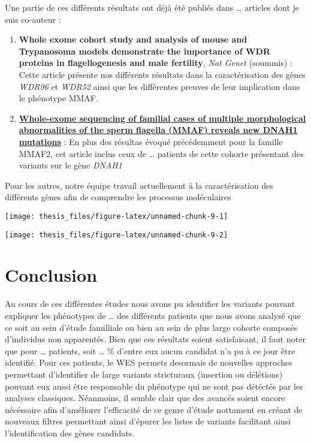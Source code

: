 \documentclass[12pt,twoside]{reedthesis}
\theoremstyle{definition}
\theoremstyle{definition}
\theoremstyle{remark}
\begin{document}
  Une partie de ces différents résultats ont déjà été publiés dans
  \ldots{} articles dont je suis co-auteur :
  
  \begin{enumerate}
  \def\labelenumi{\arabic{enumi}.}
  \item
    \textbf{Whole exome cohort study and analysis of mouse and Trypanosoma
    models demonstrate the importance of WDR proteins in flagellogenesis
    and male fertility}, \emph{Nat Genet} (soummis) : Cette article
    présente nos différents résultats dans la caractérisation des gènes
    \emph{WDR96} et \emph{WDR52} ainsi que les différentes preuves de leur
    implication dans le phénotype MMAF.
  \item
    \protect\hyperlink{famdnah1}{\textbf{Whole-exome sequencing of
    familial cases of multiple morphological abnormalities of the sperm
    flagella (MMAF) reveals new DNAH1 mutations}} : En plus des résultas
    évoqué précédemment pour la famille MMAF2, cet article inclus ceux de
    \ldots{} patients de cette cohorte présentant des variants sur le gène
    \emph{DNAH1}
  \end{enumerate}
  
  Pour les autres, notre équipe travail actuellement à la caractérisation
  des différents gènes afin de comprendre les processus moléculaires
  
  \begin{center}\texttt{[image: thesis\_files/figure-latex/unnamed-chunk-9-1]} \end{center}
  
  \begin{center}\texttt{[image: thesis\_files/figure-latex/unnamed-chunk-9-2]} \end{center}
  
  \section{Conclusion}\label{conclusion}
  
  Au cours de ces différentes études nous avons pu identifier les variants
  pouvant expliquer les phénotypes de \ldots{} des différents patients que
  nous avons analysé que ce soit au sein d'étude familliale ou bien au
  sein de plus large cohorte composés d'individus non apparentés. Bien que
  ces résultats soient satisfaisant, il faut noter que pour \ldots{}
  patients, soit \ldots{} \% d'entre eux aucun candidat n'a pu à ce jour
  être identifié. Pour ces patients, le WES permets desormais de nouvelles
  approches permettant d'identifier de large variants stricturaux
  (insertion ou délétions) pouvant eux aussi être responsable du phénotype
  qui ne sont pas détéctés par les analyses classiques. Néanmoins, il
  semble clair que des avancés soient encore nécéssaire afin d'améliorer
  l'efficacité de ce genre d'étude nottament en créant de nouveaux filtres
  permettant ainsi d'épurer les listes de variants facilitant ainsi
  l'identification des gènes candidats.
  
\end{document}
